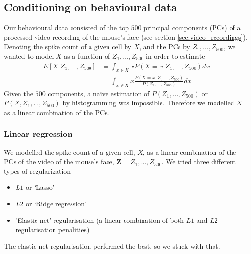 \documentclass[a4paper,12pt]{article}
\theoremstyle{definition}
\begin{document}
    \subsection{Conditioning on behavioural data}
    Our behavioural data consisted of the top $500$ principal components (PCs) of a processed video recording of the mouse's face (see section \ref{sec:video_recordings}). Denoting the spike count of a given cell by $X$, and the PCs by $Z_1,\dots,Z_{500}$, we wanted to model $X$ as a function of $Z_1,\dots,Z_{500}$ in order to estimate
    \begin{align}
      E[X|Z_1,\dots,Z_{500}] &= \int_{x \in X} x P(X=x | Z_1,\dots,Z_{500}) dx \\
        &= \int_{x \in X} x \frac{P(X=x, Z_1,\dots,Z_{500})}{P(Z_1,\dots,Z_{500})} dx
    \end{align}
    Given the $500$ components, a na\"{i}ve estimation of $P(Z_1,\dots,Z_{500})$ or $P(X, Z_1,\dots,Z_{500})$ by histogramming was impossible. Therefore we modelled $X$ as a linear combination of the PCs.

        \subsubsection{Linear regression}
        We modelled the spike count of a given cell, $X$, as a linear combination of the PCs of the video of the mouse's face, $\mathbf{Z} = Z_1,\dots,Z_{500}$. We tried three different types of regularization
        \begin{itemize}
            \item $L1$ or `Lasso'
            \item $L2$ or `Ridge regression'
            \item `Elastic net' regularisation (a linear combination of both $L1$ and $L2$ regularisation penalities)
        \end{itemize}
        The elastic net regularisation performed the best, so we stuck with that.
\end{document}
